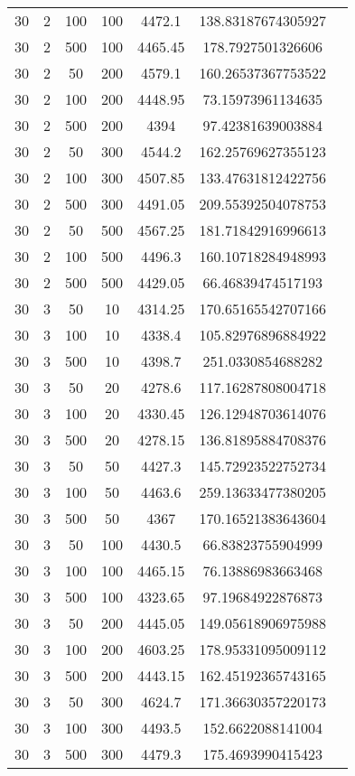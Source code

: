 {\begin{longtabu}{S
S
S
S
S
S[round-mode=places,round-precision=0]
S[round-mode=places,round-precision=0]}
30 & 2 & 100 & 100 & 4472.1 & 138.83187674305927 \\
30 & 2 & 500 & 100 & 4465.45 & 178.7927501326606 \\
30 & 2 & 50 & 200 & 4579.1 & 160.26537367753522 \\
30 & 2 & 100 & 200 & 4448.95 & 73.15973961134635 \\
30 & 2 & 500 & 200 & 4394 & 97.42381639003884 \\
30 & 2 & 50 & 300 & 4544.2 & 162.25769627355123 \\
30 & 2 & 100 & 300 & 4507.85 & 133.47631812422756 \\
30 & 2 & 500 & 300 & 4491.05 & 209.55392504078753 \\
30 & 2 & 50 & 500 & 4567.25 & 181.71842916996613 \\
30 & 2 & 100 & 500 & 4496.3 & 160.10718284948993 \\
30 & 2 & 500 & 500 & 4429.05 & 66.46839474517193 \\
30 & 3 & 50 & 10 & 4314.25 & 170.65165542707166 \\
30 & 3 & 100 & 10 & 4338.4 & 105.82976896884922 \\
30 & 3 & 500 & 10 & 4398.7 & 251.0330854688282 \\
30 & 3 & 50 & 20 & 4278.6 & 117.16287808004718 \\
30 & 3 & 100 & 20 & 4330.45 & 126.12948703614076 \\
30 & 3 & 500 & 20 & 4278.15 & 136.81895884708376 \\
30 & 3 & 50 & 50 & 4427.3 & 145.72923522752734 \\
30 & 3 & 100 & 50 & 4463.6 & 259.13633477380205 \\
30 & 3 & 500 & 50 & 4367 & 170.16521383643604 \\
30 & 3 & 50 & 100 & 4430.5 & 66.83823755904999 \\
30 & 3 & 100 & 100 & 4465.15 & 76.13886983663468 \\
30 & 3 & 500 & 100 & 4323.65 & 97.19684922876873 \\
30 & 3 & 50 & 200 & 4445.05 & 149.05618906975988 \\
30 & 3 & 100 & 200 & 4603.25 & 178.95331095009112 \\
30 & 3 & 500 & 200 & 4443.15 & 162.45192365743165 \\
30 & 3 & 50 & 300 & 4624.7 & 171.36630357220173 \\
30 & 3 & 100 & 300 & 4493.5 & 152.6622088141004 \\
30 & 3 & 500 & 300 & 4479.3 & 175.4693990415423 \\

\end{longtabu}}
